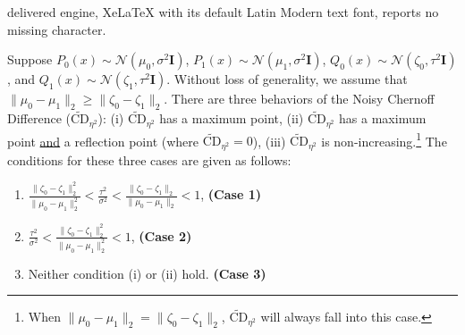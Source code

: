 \documentclass[10pt,a4paper]{amsart}
\begin{document}
delivered engine, XeLaTeX with its default Latin Modern text font, reports no missing character.
\begin{theorem} \label{thm:central}
Suppose $P_0(x)\sim\mathcal{N}(\mu_0,\sigma^2\mathbf{I})$, $P_1(x)\sim\mathcal{N}(\mu_1,\sigma^2\mathbf{I})$, $Q_0(x)\sim\mathcal{N}(\zeta_0,\tau^2\mathbf{I})$, and $Q_1(x)\sim\mathcal{N}(\zeta_1,\tau^2\mathbf{I})$. Without loss of generality, we assume that $\|\mu_0 - \mu_1\|_2 \geq \|\zeta_0 - \zeta_1\|_2$. There are three behaviors of the Noisy Chernoff Difference ($\widetilde{\text{CD}}_{\eta^2}$): (i) $\widetilde{\text{CD}}_{\eta^2}$ has a maximum point, (ii) $\widetilde{\text{CD}}_{\eta^2}$ has a maximum point \underline{and} a reflection point (where $\widetilde{\text{CD}}_{\eta^2} = 0$), (iii) $\widetilde{\text{CD}}_{\eta^2}$ is non-increasing.\footnote{When $\|\mu_0 - \mu_1\|_2 = \|\zeta_0 - \zeta_1\|_2$, $\widetilde{\text{CD}}_{\eta^2}$ will always fall into this case.} The conditions for these three cases are given as follows:
    \begin{enumerate}
        \item[(i)] $\frac{\|\zeta_0 - \zeta_1\|^2_2}{\|\mu_0 - \mu_1\|^2_2} <\frac{\tau^2}{\sigma^2} < \frac{\|\zeta_0 - \zeta_1\|_2}{\|\mu_0 - \mu_1\|_2} < 1$,  \hfill \textbf{(Case 1)}
        \item [(ii)] $\frac{\tau^2}{\sigma^2} < \frac{\|\zeta_0 - \zeta_1\|^2_2}{\|\mu_0 - \mu_1\|^2_2} < 1$, \hfill \textbf{(Case 2)}
        \item [(iii)] Neither condition (i) or (ii) hold. \hfill \textbf{(Case 3)}
    \end{enumerate}    %
\end{theorem}
\end{document}
